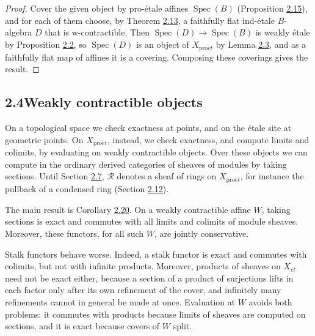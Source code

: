 \documentclass[11pt]{article}
\begin{document}
\begin{proof}[{Proof}]\label{bp50}%
Cover the given object by pro-étale affines \(\operatorname{Spec}(B)\) (Proposition \hyperref[bp44]{2.15}), and for each of them choose, by Theorem \hyperref[bp37]{2.13}, a faithfully flat ind-étale \(B\)-algebra \(D\) that is w-contractible. Then \(\operatorname{Spec}(D)\to\operatorname{Spec}(B)\) is weakly étale by Proposition \hyperref[bp7]{2.2}, so \(\operatorname{Spec}(D)\) is an object of \(X_{\mathrm{pro}\acute{e}t}\) by Lemma \hyperref[bp10]{2.3}, and as a faithfully flat map of affines it is a covering. Composing these coverings gives the result.
\end{proof}


\subsection*{\texorpdfstring{2.4\quad Weakly contractible objects}{2.4 Weakly contractible objects}}
\label{bp51}%
\label{bp52}%
On a topological space we check exactness at points, and on the étale site at geometric points. On \(X_{\mathrm{pro}\acute{e}t}\), instead, we check exactness, and compute limits and colimits, by evaluating on weakly contractible objects. Over these objects we can compute in the ordinary derived categories of sheaves of modules by taking sections. Until Section \hyperref[bp87]{2.7}, \(\mathcal R\) denotes a sheaf of rings on \(X_{\mathrm{pro}\acute{e}t}\), for instance the pullback of a condensed ring (Section \hyperref[bp147]{2.12}).

The main result is Corollary \hyperref[bp57]{2.20}. On a weakly contractible affine \(W\), taking sections is exact and commutes with all limits and colimits of module sheaves. Moreover, these functors, for all such \(W\), are jointly conservative.

Stalk functors behave worse. Indeed, a stalk functor is exact and commutes with colimits, but not with infinite products. Moreover, products of sheaves on \(X_{\acute{e}t}\) need not be exact either, because a section of a product of surjections lifts in each factor only after its own refinement of the cover, and infinitely many refinements cannot in general be made at once. Evaluation at \(W\) avoids both problems: it commutes with products because limits of sheaves are computed on sections, and it is exact because covers of \(W\) split.
\end{document}
